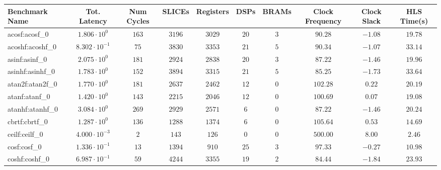 \begin{tabular}{|l|c|c|c|c|c|c|c|c|c|}
\hline
Benchmark Name               & Tot. Latency            & Num Cycles & SLICEs    & Registers & DSPs    & BRAMs  & Clock Frequency & Clock Slack & HLS Time(s) \\
\hline
acosf:acosf\_0               & $ 1.806 \cdot 10^{0}  $ & $ 163    $ & $ 3196  $ & $ 3029  $ & $ 20  $ & $ 3  $ & $ 90.28       $ & $ -1.08   $ & $ 19.78   $ \\
acoshf:acoshf\_0             & $ 8.302 \cdot 10^{-1} $ & $ 75     $ & $ 3830  $ & $ 3353  $ & $ 21  $ & $ 5  $ & $ 90.34       $ & $ -1.07   $ & $ 33.14   $ \\
asinf:asinf\_0               & $ 2.075 \cdot 10^{0}  $ & $ 181    $ & $ 2924  $ & $ 2838  $ & $ 20  $ & $ 3  $ & $ 87.22       $ & $ -1.46   $ & $ 19.96   $ \\
asinhf:asinhf\_0             & $ 1.783 \cdot 10^{0}  $ & $ 152    $ & $ 3894  $ & $ 3315  $ & $ 21  $ & $ 5  $ & $ 85.25       $ & $ -1.73   $ & $ 33.64   $ \\
atan2f:atan2f\_0             & $ 1.770 \cdot 10^{0}  $ & $ 181    $ & $ 2637  $ & $ 2462  $ & $ 12  $ & $ 0  $ & $ 102.28      $ & $ 0.22    $ & $ 20.19   $ \\
atanf:atanf\_0               & $ 1.420 \cdot 10^{0}  $ & $ 143    $ & $ 2215  $ & $ 2046  $ & $ 12  $ & $ 0  $ & $ 100.69      $ & $ 0.07    $ & $ 19.08   $ \\
atanhf:atanhf\_0             & $ 3.084 \cdot 10^{0}  $ & $ 269    $ & $ 2929  $ & $ 2571  $ & $ 6   $ & $ 0  $ & $ 87.22       $ & $ -1.46   $ & $ 20.24   $ \\
cbrtf:cbrtf\_0               & $ 1.287 \cdot 10^{0}  $ & $ 136    $ & $ 1288  $ & $ 1374  $ & $ 6   $ & $ 0  $ & $ 105.64      $ & $ 0.53    $ & $ 14.69   $ \\
ceilf:ceilf\_0               & $ 4.000 \cdot 10^{-3} $ & $ 2      $ & $ 143   $ & $ 126   $ & $ 0   $ & $ 0  $ & $ 500.00      $ & $ 8.00    $ & $ 2.46    $ \\
cosf:cosf\_0                 & $ 1.336 \cdot 10^{-1} $ & $ 13     $ & $ 1394  $ & $ 910   $ & $ 25  $ & $ 3  $ & $ 97.33       $ & $ -0.27   $ & $ 10.98   $ \\
coshf:coshf\_0               & $ 6.987 \cdot 10^{-1} $ & $ 59     $ & $ 4244  $ & $ 3355  $ & $ 19  $ & $ 2  $ & $ 84.44       $ & $ -1.84   $ & $ 23.93   $ \\

\end{tabular}
